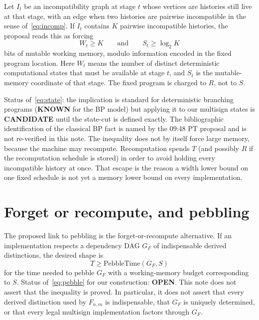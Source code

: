 \documentclass[11pt]{article}
\begin{document}
Let \(I_t\) be an incompatibility graph at stage \(t\) whose vertices are histories still live at that stage, with an edge when two histories are pairwise incompatible in the sense of~\eqref{eq:incomp}.
If \(I_t\) contains \(K\) pairwise incompatible histories, the proposal reads this as forcing
\begin{equation}
W_t\ge K
\qquad\text{and}\qquad
S_t\ge \log_2 K
\label{eq:state}
\end{equation}
bits of mutable working memory, modulo information encoded in the fixed program location.
Here \(W_t\) means the number of distinct deterministic computational states that must be available at stage \(t\), and \(S_t\) is the mutable-memory coordinate of that stage.
The fixed program is charged to \(R\), not to \(S\).

Status of~\eqref{eq:state}: the implication is standard for deterministic branching programs (\textbf{KNOWN} for the BP model) but applying it to our multisign states is \textbf{CANDIDATE} until the state-cut is defined exactly.
The bibliographic identification of the classical BP fact is named by the 09:48 PT proposal and is not re-verified in this note.
The inequality does not by itself force large memory, because the machine may recompute.
Recomputation spends \(T\) (and possibly \(R\) if the recomputation schedule is stored) in order to avoid holding every incompatible history at once.
That escape is the reason a width lower bound on one fixed schedule is not yet a memory lower bound on every implementation.

\section{Forget or recompute, and pebbling}
The proposed link to pebbling is the forget-or-recompute alternative.
If an implementation respects a dependency DAG \(G_F\) of indispensable derived distinctions, the desired shape is
\begin{equation}
T \ge \mathrm{PebbleTime}(G_F,S)
\label{eq:pebble}
\end{equation}
for the time needed to pebble \(G_F\) with a working-memory budget corresponding to \(S\).
Status of~\eqref{eq:pebble} for our construction: \textbf{OPEN}.
This note does not assert that the inequality is proved.
In particular, it does not assert that every derived distinction used by \(F_{n,m}\) is indispensable, that \(G_F\) is uniquely determined, or that every legal multisign implementation factors through \(G_F\).
\end{document}
